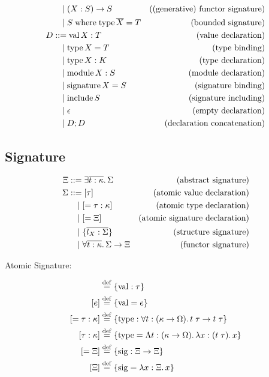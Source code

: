 \begin{align*}
  &\BNFor (X: S) \to S &(\text{(generative) functor signature}) \\
  &\BNFor S \symwhere \symtype \overline{X} = T &(\text{bounded signature}) \\
  D
  &\BNFassign \symval X: T &(\text{value declaration}) \\
  &\BNFor \symtype X = T &(\text{type binding}) \\
  &\BNFor \symtype X: K &(\text{type declaration}) \\
  &\BNFor \symmodule X: S &(\text{module declaration}) \\
  &\BNFor \symsignature X = S &(\text{signature binding}) \\
  &\BNFor \syminclude S &(\text{signature including}) \\
  &\BNFor \epsilon &(\text{empty declaration}) \\
  &\BNFor D; D &(\text{declaration concatenation})
\end{align*}

\subsection{Signature}

\begin{align*}
  \Xi
  &\BNFassign \exists \overline{t: \kappa}\ldotp \Sigma &(\text{abstract signature}) \\
  \Sigma
  &\BNFassign [\tau] &(\text{atomic value declaration}) \\
  &\BNFor [= \tau: \kappa] &(\text{atomic type declaration}) \\
  &\BNFor [= \Xi] &(\text{atomic signature declaration}) \\
  &\BNFor \{\overline{l_X: \Sigma}\} &(\text{structure signature}) \\
  &\BNFor \forall \overline{t: \kappa}\ldotp \Sigma \to \Xi &(\text{functor signature})
\end{align*}

Atomic Signature:

\begin{align*}
  [\tau] &\defrel{=} \{\symval: \tau\} \\
  [e] &\defrel{=} \{\symval = e\} \\
  [= \tau: \kappa] &\defrel{=} \{\symtype: \forall t: (\kappa \to \Omega)\ldotp t\; \tau \to t\; \tau\} \\
  [\tau: \kappa] &\defrel{=} \{\symtype = \Lambda t: (\kappa \to \Omega)\ldotp \lambda x: (t\; \tau)\ldotp x\} \\
  [= \Xi] &\defrel{=} \{\symsig: \Xi \to \Xi\} \\
  [\Xi] &\defrel{=} \{\symsig = \lambda x: \Xi\ldotp x\}
\end{align*}

